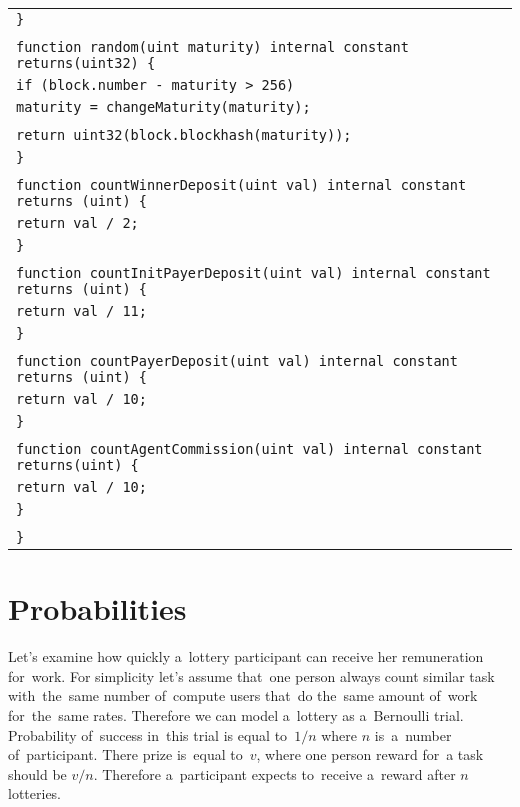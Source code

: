 \documentclass[a4paper]{article}
\begin{document}
\begin{tabularx}{\linewidth}{l}
        \qquad\texttt{\}}\\
        \\
        \qquad\texttt{function random(uint maturity) internal constant returns(uint32) \{}\\
        \qquad\qquad\texttt{if (block.number - maturity > 256)}\\
        \qquad\qquad\qquad\texttt{maturity = changeMaturity(maturity);}\\
        \\
        \qquad\qquad\texttt{return uint32(block.blockhash(maturity));}\\
        \qquad\texttt{\}}\\
        \\
        \qquad\texttt{function countWinnerDeposit(uint val) internal constant returns (uint) \{}\\
        \qquad\qquad\texttt{return val / 2;}\\
        \qquad\texttt{\}}\\
        \\
        \qquad\texttt{function countInitPayerDeposit(uint val) internal constant returns (uint) \{}\\
        \qquad\qquad\texttt{return val / 11;}\\
        \qquad\texttt{\}}\\
        \\
        \qquad\texttt{function countPayerDeposit(uint val) internal constant returns (uint) \{}\\
        \qquad\qquad\texttt{return val / 10;}\\
        \qquad\texttt{\}}\\
        \\
        \qquad\texttt{function countAgentCommission(uint val) internal constant returns(uint) \{}\\
        \qquad\qquad\texttt{return val / 10;}\\
        \qquad\texttt{\}}\\
        \\
        \texttt{\}}\\
    \end{tabularx}

\section{Probabilities}

    Let's examine how quickly a~lottery participant can receive her remuneration for~work. For simplicity let's assume
    that~one person always count similar task with~the~same number of~compute users that~do the~same amount of~work
    for~the~same rates. Therefore we can model a~lottery as a~Bernoulli trial. Probability of~success in~this trial is
    equal to~$1/n$ where $n$ is~a~number of~participant. There prize is~equal to~$v$, where one person reward for~a
    task should be $v/n$. Therefore a~participant expects to~receive a~reward after $n$ lotteries.
\end{document}
